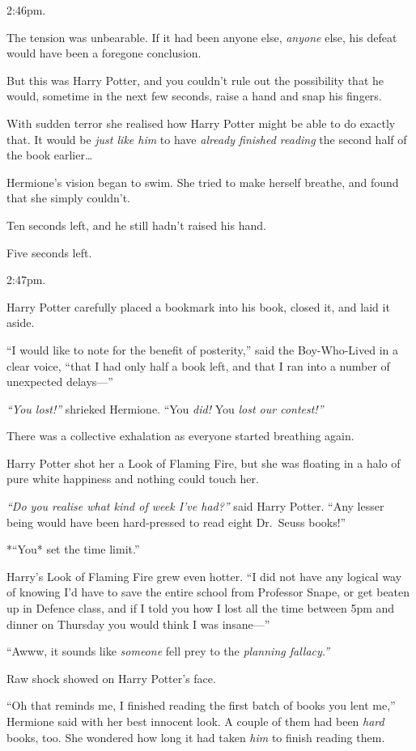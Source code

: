2:46pm.

The tension was unbearable. If it had been anyone else, \emph{anyone}
else, his defeat would have been a foregone conclusion.

But this was Harry Potter, and you couldn't rule out the possibility
that he would, sometime in the next few seconds, raise a hand and snap
his fingers.

With sudden terror she realised how Harry Potter might be able to do
exactly that. It would be \emph{just like him} to have \emph{already
finished reading} the second half of the book earlier\ldots{}

Hermione's vision began to swim. She tried to make herself breathe, and
found that she simply couldn't.

Ten seconds left, and he still hadn't raised his hand.

Five seconds left.

2:47pm.

Harry Potter carefully placed a bookmark into his book, closed it, and
laid it aside.

``I would like to note for the benefit of posterity,'' said the
Boy-Who-Lived in a clear voice, ``that I had only half a book left, and
that I ran into a number of unexpected delays---''

\emph{``You lost!''} shrieked Hermione. ``You \emph{did!} You \emph{lost
our contest!''}

There was a collective exhalation as everyone started breathing again.

Harry Potter shot her a Look of Flaming Fire, but she was floating in a
halo of pure white happiness and nothing could touch her.

\emph{``Do you realise what kind of week I've had?''} said Harry Potter.
``Any lesser being would have been hard-pressed to read eight Dr.~Seuss
books!''

*``You* set the time limit.''

Harry's Look of Flaming Fire grew even hotter. ``I did not have any
logical way of knowing I'd have to save the entire school from Professor
Snape, or get beaten up in Defence class, and if I told you how I lost
all the time between 5pm and dinner on Thursday you would think I was
insane---''

``Awww, it sounds like \emph{someone} fell prey to the \emph{planning
fallacy.''}

Raw shock showed on Harry Potter's face.

``Oh that reminds me, I finished reading the first batch of books you
lent me,'' Hermione said with her best innocent look. A couple of them
had been \emph{hard} books, too. She wondered how long it had taken
\emph{him} to finish reading them.

